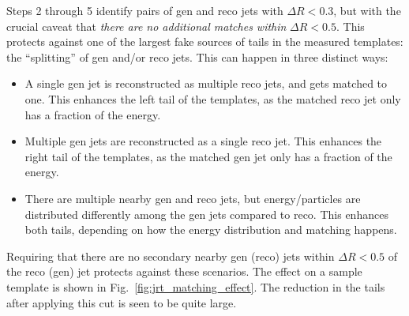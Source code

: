 Steps 2 through 5 identify pairs of gen and reco jets with $\Delta R<0.3$, but with the crucial caveat that 
\emph{there are no additional matches within} $\Delta R<0.5$. This protects against one of the largest fake sources
of tails in the measured templates: the ``splitting'' of gen and/or reco jets. This can happen in three distinct ways:
\begin{itemize}
  \item A single gen jet is reconstructed as multiple reco jets, and gets matched to one. 
  This enhances the left tail of the templates, as the matched reco jet only has a fraction of the energy.
  \item Multiple gen jets are reconstructed as a single reco jet. This enhances the right tail of the 
  templates, as the matched gen jet only has a fraction of the energy.
  \item There are multiple nearby gen and reco jets, but energy/particles are distributed differently 
  among the gen jets compared to reco. This enhances both tails, depending on how the energy distribution
  and matching happens.
\end{itemize}
Requiring that there are no secondary nearby gen (reco) jets within $\Delta R<0.5$ of the reco (gen) jet protects against these scenarios.
The effect on a sample template is shown in Fig.~\ref{fig:jrt_matching_effect}. 
The reduction in the tails after applying this cut is seen to be quite large.

